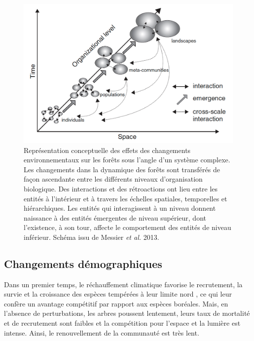 \begin{figure}
\centering
\includegraphics[width=.9\textwidth]{conclusion/figures/complex.png}
\caption[Représentation conceptuelle des effets des changements environnementaux sur les différents niveaux d'organisation biologique]{Représentation conceptuelle des effets des changements environnementaux sur les forêts sous l'angle d'un système complexe. Les changements dans la dynamique des forêts sont transférés de façon ascendante entre les différents niveaux d'organisation biologique. Des interactions et des rétroactions ont lieu entre les entités à l'intérieur et à travers les échelles spatiales, temporelles et hiérarchiques. Les entités qui interagissent à un niveau donnent naissance à des entités émergentes de niveau supérieur, dont l'existence, à son tour, affecte le comportement des entités de niveau inférieur. Schéma issu de Messier \emph{et al.} 2013.}
\label{fig4.2}
\end{figure}

\hypertarget{changements-duxe9mographiques}{%
\subsection{Changements
démographiques}\label{changements-duxe9mographiques}}

Dans un premier temps, le réchauffement climatique favorise le
recrutement, la survie et la croissance des espèces tempérées à leur
limite nord \citep[Chapitre
3;][]{fisichelli_temperate_2014, boisvertmarsh_divergent_2019, peng_drought-induced_2011, goldblum_tree_2005, grundmann_impact_2011, bolte_understory_2014},
ce qui leur confère un avantage compétitif par rapport aux espèces
boréales. Mais, en l'absence de perturbations, les arbres poussent
lentement, leurs taux de mortalité et de recrutement sont faibles et la
compétition pour l'espace et la lumière est intense. Ainsi, le
renouvellement de la communauté est très lent.

